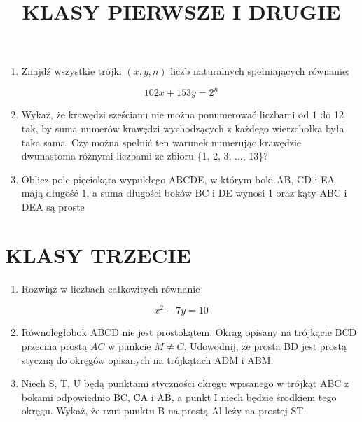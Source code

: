 \documentclass[10pt]{article}
\title{KLASY PIERWSZE I DRUGIE }
\author{}
\date{}
\begin{document}
\maketitle
\begin{enumerate}
  \item Znajdź wszystkie trójki \((x, y, n)\) liczb naturalnych spełniających równanie:
\end{enumerate}

\[
102 x+153 y=2^{n}
\]

\begin{enumerate}
  \setcounter{enumi}{1}
  \item Wykaż, że krawędzi sześcianu nie można ponumerować liczbami od 1 do 12 tak, by suma numerów krawędzi wychodzących z każdego wierzchołka była taka sama. Czy można spełnić ten warunek numerując krawędzie dwunastoma różnymi liczbami ze zbioru \{1, 2, 3, ..., 13\}?
  \item Oblicz pole pięciokąta wypukłego ABCDE, w którym boki AB, CD i EA mają długość 1, a suma długości boków BC i DE wynosi 1 oraz kąty ABC i DEA są proste
\end{enumerate}

\section*{KLASY TRZECIE}
\begin{enumerate}
  \item Rozwiąż w liczbach całkowitych równanie
\end{enumerate}

\[
x^{2}-7 y=10
\]

\begin{enumerate}
  \setcounter{enumi}{1}
  \item Równoległobok ABCD nie jest prostokątem. Okrąg opisany na trójkącie BCD przecina prostą \(A C\) w punkcie \(M \neq C\). Udowodnij, że prosta BD jest prostą styczną do okręgów opisanych na trójkątach ADM i ABM.
  \item Niech S, T, U będą punktami styczności okręgu wpisanego w trójkąt ABC z bokami odpowiednio BC, CA i AB, a punkt I niech będzie środkiem tego okręgu. Wykaż, że rzut punktu B na prostą Al leży na prostej ST.
\end{enumerate}
\end{document}
